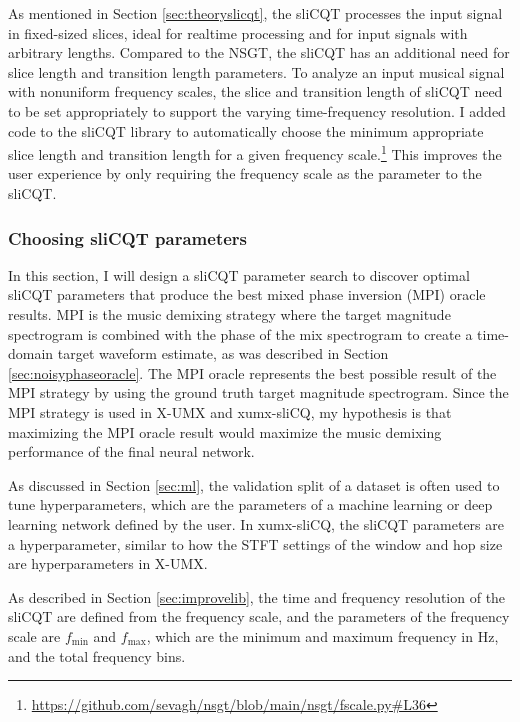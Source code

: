 \documentclass[report.tex]{subfiles}
\begin{document}
As mentioned in Section \ref{sec:theoryslicqt}, the sliCQT processes the input signal in fixed-sized slices, ideal for realtime processing and for input signals with arbitrary lengths. Compared to the NSGT, the sliCQT has an additional need for slice length and transition length parameters. To analyze an input musical signal with nonuniform frequency scales, the slice and transition length of sliCQT need to be set appropriately to support the varying time-frequency resolution. I added code to the sliCQT library to automatically choose the minimum appropriate slice length and transition length for a given frequency scale.\footnote{\url{https://github.com/sevagh/nsgt/blob/main/nsgt/fscale.py\#L36}} This improves the user experience by only requiring the frequency scale as the parameter to the sliCQT.

\subsubsection{Choosing sliCQT parameters}
\label{sec:slicqparamsrch}

In this section, I will design a sliCQT parameter search to discover optimal sliCQT parameters that produce the best mixed phase inversion (MPI) oracle results. MPI is the music demixing strategy where the target magnitude spectrogram is combined with the phase of the mix spectrogram to create a time-domain target waveform estimate, as was described in Section \ref{sec:noisyphaseoracle}. The MPI oracle represents the best possible result of the MPI strategy by using the ground truth target magnitude spectrogram. Since the MPI strategy is used in X-UMX and xumx-sliCQ, my hypothesis is that maximizing the MPI oracle result would maximize the music demixing performance of the final neural network.

As discussed in Section \ref{sec:ml}, the validation split of a dataset is often used to tune hyperparameters, which are the parameters of a machine learning or deep learning network defined by the user. In xumx-sliCQ, the sliCQT parameters are a hyperparameter, similar to how the STFT settings of the window and hop size are hyperparameters in X-UMX.

As described in Section \ref{sec:improvelib}, the time and frequency resolution of the sliCQT are defined from the frequency scale, and the parameters of the frequency scale are $f_{\text{min}}$ and $f_{\text{max}}$, which are the minimum and maximum frequency in Hz, and the total frequency bins.
\end{document}
